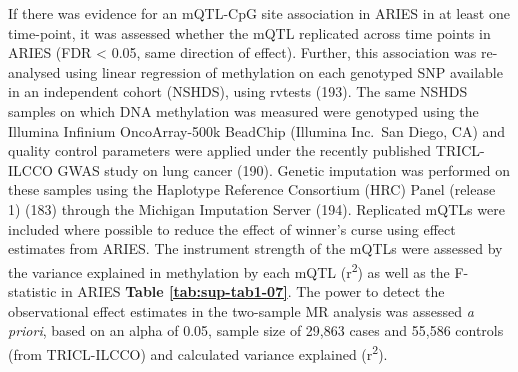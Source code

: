 \documentclass[11pt,oneside]{bristolthesis}
\begin{document}
If there was evidence for an mQTL-CpG site association in ARIES in at least one time-point, it was assessed whether the mQTL replicated across time points in ARIES (FDR \textless{} 0.05, same direction of effect). Further, this association was re-analysed using linear regression of methylation on each genotyped SNP available in an independent cohort (NSHDS), using rvtests (193). The same NSHDS samples on which DNA methylation was measured were genotyped using the Illumina Infinium OncoArray-500k BeadChip (Illumina Inc.~San Diego, CA) and quality control parameters were applied under the recently published TRICL-ILCCO GWAS study on lung cancer (190). Genetic imputation was performed on these samples using the Haplotype Reference Consortium (HRC) Panel (release 1) (183) through the Michigan Imputation Server (194). Replicated mQTLs were included where possible to reduce the effect of winner's curse using effect estimates from ARIES. The instrument strength of the mQTLs were assessed by the variance explained in methylation by each mQTL (r\textsuperscript{2}) as well as the F-statistic in ARIES \textbf{Table \ref{tab:sup-tab1-07}}. The power to detect the observational effect estimates in the two-sample MR analysis was assessed \emph{a priori}, based on an alpha of 0.05, sample size of 29,863 cases and 55,586 controls (from TRICL-ILCCO) and calculated variance explained (r\textsuperscript{2}). \linebreak
\end{document}

